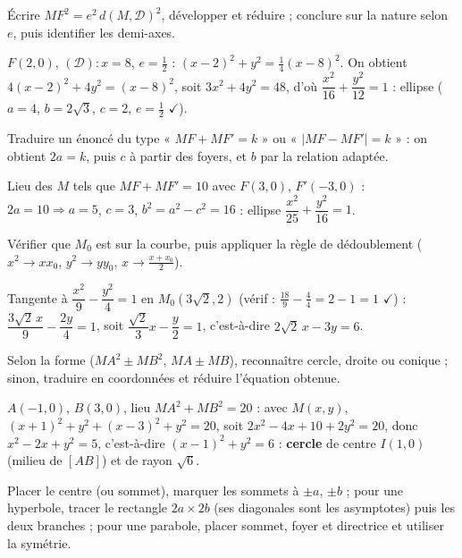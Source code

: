 Écrire $MF^{2}=e^{2}\,d(M,\mathcal D)^{2}$, développer et réduire ; conclure sur la nature
selon $e$, puis identifier les demi-axes.
\begin{exemple}
$F(2,0)$, $(\mathcal D):x=8$, $e=\tfrac12$ : $(x-2)^{2}+y^{2}=\tfrac14(x-8)^{2}$.
On obtient $4(x-2)^{2}+4y^{2}=(x-8)^{2}$, soit $3x^{2}+4y^{2}=48$,
d'où $\dfrac{x^{2}}{16}+\dfrac{y^{2}}{12}=1$ : ellipse ($a=4$, $b=2\sqrt3$, $c=2$, $e=\tfrac12$ $\checkmark$).
\end{exemple}

Traduire un énoncé du type « $MF+MF'=k$ » ou « $|MF-MF'|=k$ » : on obtient $2a=k$, puis
$c$ à partir des foyers, et $b$ par la relation adaptée.
\begin{exemple}
Lieu des $M$ tels que $MF+MF'=10$ avec $F(3,0)$, $F'(-3,0)$ : $2a=10\Rightarrow a=5$,
$c=3$, $b^2=a^2-c^2=16$ : ellipse $\dfrac{x^2}{25}+\dfrac{y^2}{16}=1$.
\end{exemple}

Vérifier que $M_0$ est sur la courbe, puis appliquer la règle de dédoublement
($x^{2}\to xx_0$, $y^{2}\to yy_0$, $x\to\tfrac{x+x_0}2$).
\begin{exemple}
Tangente à $\dfrac{x^{2}}{9}-\dfrac{y^{2}}{4}=1$ en $M_0(3\sqrt2,2)$ (vérif :
$\tfrac{18}9-\tfrac44=2-1=1$ $\checkmark$) : $\dfrac{3\sqrt2\,x}{9}-\dfrac{2y}{4}=1$, soit
$\dfrac{\sqrt2}{3}x-\dfrac y2=1$, c'est-à-dire $2\sqrt2\,x-3y=6$.
\end{exemple}

Selon la forme ($MA^2\pm MB^2$, $MA\pm MB$), reconnaître cercle, droite ou conique ;
sinon, traduire en coordonnées et réduire l'équation obtenue.
\begin{exemple}
$A(-1,0)$, $B(3,0)$, lieu $MA^{2}+MB^{2}=20$ : avec $M(x,y)$,
$(x+1)^{2}+y^{2}+(x-3)^{2}+y^{2}=20$, soit $2x^{2}-4x+10+2y^{2}=20$, donc
$x^{2}-2x+y^{2}=5$, c'est-à-dire $(x-1)^{2}+y^{2}=6$ : \textbf{cercle} de centre $I(1,0)$
(milieu de $[AB]$) et de rayon $\sqrt6$.
\end{exemple}

Placer le centre (ou sommet), marquer les sommets à $\pm a$, $\pm b$ ; pour une hyperbole,
tracer le rectangle $2a\times2b$ (ses diagonales sont les asymptotes) puis les deux
branches ; pour une parabole, placer sommet, foyer et directrice et utiliser la symétrie.

